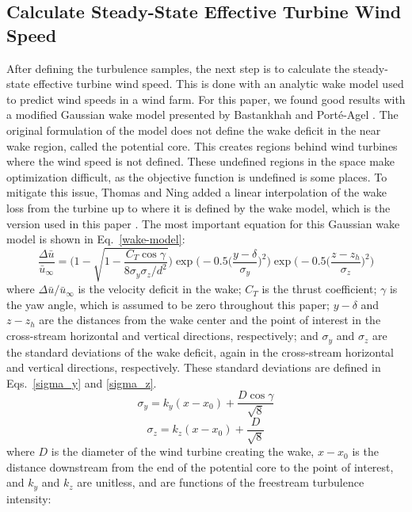 \documentclass[11pt,letterpaper]{article}
\begin{document}
\subsection{Calculate Steady-State Effective Turbine Wind Speed}

After defining the turbulence samples, the next step is to calculate the steady-state effective turbine wind speed. This is done with an analytic wake model used to predict wind speeds in a wind farm. For this paper, we found good results with a modified Gaussian wake model presented by Bastankhah and Porté-Agel \cite{bastankhah2016experimental}.
% 
The original formulation of the model does not define the wake deficit in the near wake region, called the potential core. This creates regions behind wind turbines where the wind speed is not defined. These undefined regions in the space make optimization difficult, as the objective function is undefined is some places. To mitigate this issue, Thomas and Ning added a linear interpolation of the wake loss from the turbine up to where it is defined by the wake model, which is the version used in this paper \cite{Thomas2018}. 
The most important equation for this Gaussian wake model is shown in Eq.~\ref{wake-model}:
% 
\begin{equation}
    \label{wake-model}
    \frac{\Delta\bar{u}}{\bar{u}_{\infty}} = \Bigg(1 - \sqrt{1 - \frac{C_T \cos{\gamma}}{8\sigma_y\sigma_z/d^2}}  \Bigg) \exp{\bigg(-0.5\Big(\frac{y-\delta}{\sigma_y} \Big)^2}\bigg) \exp{\bigg(-0.5\Big(\frac{z-z_h}{\sigma_z} \Big)^2}\bigg)
\end{equation}
%
\noindent where $\Delta\bar{u}/\bar{u}_{\infty}$ is the velocity deficit in the wake; $C_T$ is the thrust coefficient; $\gamma$ is the yaw angle, which is assumed to be zero throughout this paper; $y-\delta$ and $z-z_h$ are the distances from the wake center and the point of interest in the cross-stream horizontal and vertical directions, respectively; and $\sigma_y$ and $\sigma_z$ are the standard deviations of the wake deficit, again in the cross-stream horizontal and vertical directions, respectively. These standard deviations are defined in Eqs.~\ref{sigma_y} and \ref{sigma_z}.
%
\begin{equation}
    \label{sigma_y}
    \sigma_y = k_y(x-x_0) + \frac{D\cos{\gamma}}{\sqrt{8}}
\end{equation}
%
\begin{equation}
    \label{sigma_z}
    \sigma_z = k_z(x-x_0) + \frac{D}{\sqrt{8}}
\end{equation}
%
\noindent where $D$ is the diameter of the wind turbine creating the wake, $x-x_0$ is the distance downstream from the end of the potential core to the point of interest, and $k_y$ and $k_z$ are unitless, and are functions of the freestream turbulence intensity:
\end{document}
